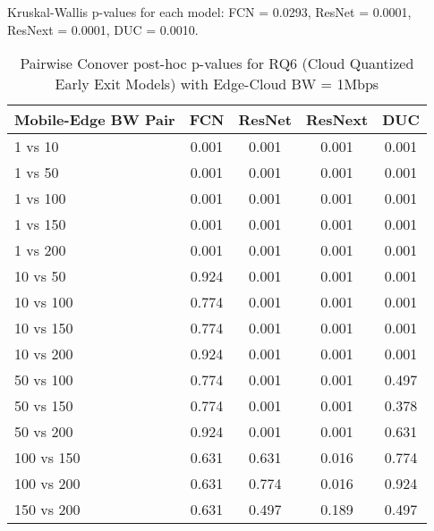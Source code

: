 \begin{table}[h]
\centering
\caption{Pairwise Conover post-hoc p-values for RQ6 (Cloud Quantized Early Exit Models) with Edge-Cloud BW = 1Mbps}
\label{tab:conover_cloud_quantized_earlyexit_ec1}
\smallskip
Kruskal-Wallis p-values for each model: FCN = 0.0293, ResNet = 0.0001, ResNext = 0.0001, DUC = 0.0010.

\begin{tabular}{lcccc}
\toprule
Mobile-Edge BW Pair & FCN & ResNet & ResNext & DUC \\
\midrule
1 vs 10 & 0.001 & 0.001 & 0.001 & 0.001 \\
1 vs 50 & 0.001 & 0.001 & 0.001 & 0.001 \\
1 vs 100 & 0.001 & 0.001 & 0.001 & 0.001 \\
1 vs 150 & 0.001 & 0.001 & 0.001 & 0.001 \\
1 vs 200 & 0.001 & 0.001 & 0.001 & 0.001 \\
10 vs 50 & 0.924 & 0.001 & 0.001 & 0.001 \\
10 vs 100 & 0.774 & 0.001 & 0.001 & 0.001 \\
10 vs 150 & 0.774 & 0.001 & 0.001 & 0.001 \\
10 vs 200 & 0.924 & 0.001 & 0.001 & 0.001 \\
50 vs 100 & 0.774 & 0.001 & 0.001 & 0.497 \\
50 vs 150 & 0.774 & 0.001 & 0.001 & 0.378 \\
50 vs 200 & 0.924 & 0.001 & 0.001 & 0.631 \\
100 vs 150 & 0.631 & 0.631 & 0.016 & 0.774 \\
100 vs 200 & 0.631 & 0.774 & 0.016 & 0.924 \\
150 vs 200 & 0.631 & 0.497 & 0.189 & 0.497 \\
\bottomrule
\end{tabular}
\end{table}

